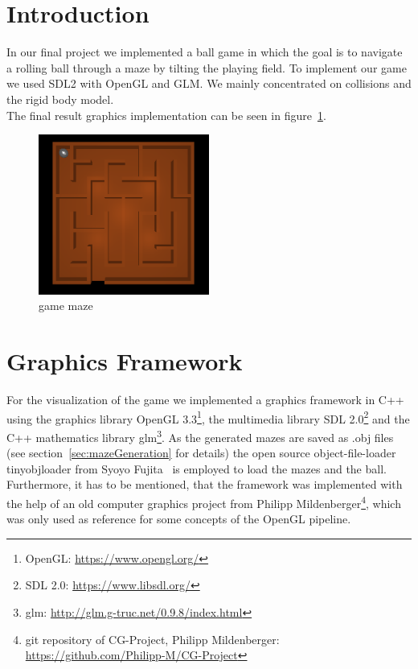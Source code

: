 \documentclass[11pt,a4paper]{article}
\begin{document}
\section{Introduction}
\label{sec:intro}
In our final project we implemented a ball game in which the goal is to navigate a rolling ball through a maze by tilting the playing field. To implement our game we used SDL2 with OpenGL and GLM. We mainly concentrated on collisions and the rigid body model.\\
The final result graphics implementation can be seen in figure~\ref{fig:gamemaze}.
\begin{figure}[H]
\centering
\includegraphics[width=0.5\textwidth]{images/ballmaze}
\caption{game maze}
\label{fig:gamemaze}
\end{figure}

\section{Graphics Framework}
\label{sec:graphic}
For the visualization of the game we implemented a graphics framework in C++ using the graphics library OpenGL 3.3\footnote{OpenGL: \url{https://www.opengl.org/}}, the multimedia library SDL 2.0\footnote{SDL 2.0: \url{https://www.libsdl.org/}} and the C++ mathematics library glm\footnote{glm: \url{http://glm.g-truc.net/0.9.8/index.html}}. As the generated mazes are saved as .obj files (see section~\ref{sec:mazeGeneration} for details) the open source object-file-loader tinyobjloader from Syoyo Fujita~\cite{tinyobjloader} is employed to load the mazes and the ball. Furthermore, it has to be mentioned, that the framework was implemented with the help of an old computer graphics project from Philipp Mildenberger\footnote{git repository of CG-Project, Philipp Mildenberger: \url{https://github.com/Philipp-M/CG-Project}}, which was only used as reference for some concepts of the OpenGL pipeline.
\end{document}
